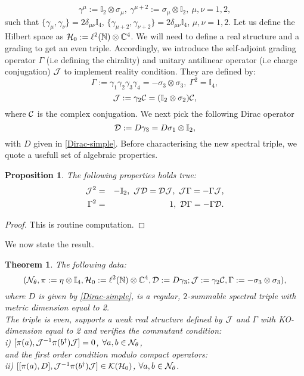 \documentclass[a4paper,11pt,twoside]{article}
\numberwithin{equation}{section}
\newcommand\bbone{{ \mathbb{I}}}
\newtheorem{theorem}[Theorem]{Theorem}
\newtheorem{proposition}[Theorem]{Proposition}
\theoremstyle{nonumberplain}
\newtheorem{proof}{Proof}
\newcounter{and}
\begin{document}
\begin{equation}
\gamma^\mu:=\bbone_2\otimes\sigma_\mu,\ \gamma^{\mu+2}:=\sigma_\mu\otimes\bbone_2,\ \mu,\nu=1,2,\label{ko-clifford}
\end{equation}
such that $\{\gamma_\mu,\gamma_\nu \}=2\delta_{\mu\nu}\bbone_4$, $\{\gamma_{\mu+2},\gamma_{\nu+2} \}=2\delta_{\mu\nu}\bbone_4$, $\mu,\nu=1,2$. Let us define the Hilbert space as ${\cal{H}}_0:=\ell^2(\mathbb{N})\otimes\mathbb{C}^4$. We will need to define a real structure and a grading to get an even triple. Accordingly, we introduce the self-adjoint grading operator $\Gamma$ (i.e defining the chirality) and unitary antilinear operator (i.e charge conjugation) ${\cal{J}}$ to implement reality condition. They are defined by:
\begin{equation}
\Gamma:=\gamma_1\gamma_2\gamma_3\gamma_4=-\sigma_3\otimes\sigma_3,\ \Gamma^2=\bbone_4\label{chiral},
\end{equation}
\begin{equation}
{\cal{J}}:=\gamma_2{\cal{C}}=(\bbone_2\otimes\sigma_2){\cal{C}},
\end{equation}
where ${\cal{C}}$ is the complex conjugation. We next pick the following Dirac operator
\begin{equation}
{\cal{D}}:=D\gamma_3=D\sigma_1\otimes\bbone_2,
\end{equation}
with $D$ given in \eqref{Dirac-simple}. Before characterising the new spectral triple, we quote a usefull set of algebraic properties.
\begin{proposition}\label{KO-real}
The following properties holds true:
\begin{eqnarray}
{\cal{J}}^2&=&-\bbone_2,\ {\cal{J}}{\cal{D}}={\cal{D}}{\cal{J}},\ {\cal{J}}\Gamma=-\Gamma{\cal{J}},\label{KO-dim}\\ 
\Gamma^2&=&1,\ {\cal{D}}\Gamma=-\Gamma{\cal{D}}\label{real-struct-grad}.
\end{eqnarray}
\end{proposition}
\begin{proof}
This is routine computation.
\end{proof}
We now state the result.
\begin{theorem}\label{th2}
The following data:
 \begin{equation}
({\cal{N}}_\theta,\pi:=\eta\otimes\bbone_4,{\cal{H}}_0:=\ell^2(\mathbb{N})\otimes\mathbb{C}^4,{\cal{D}}:=D\gamma_3;{\cal{J}}:=\gamma_2{\cal{C}},\Gamma:=-\sigma_3\otimes\sigma_3),\label{ncg-fluctuat}
\end{equation}
where $D$ is given by \eqref{Dirac-simple}, is a regular, $2$-summable spectral triple with metric dimension equal to 2. \\
The triple is even, supports a weak real structure defined by ${\cal{J}}$ and $\Gamma$ with KO-dimension equal to 2 and verifies the commutant condition:\\
i) $[\pi(a),{\cal{J}}^{-1}\pi(b^\dag){\cal{J}}]=0$, $\forall a,b\in{\cal{N}}_\theta$,\\
and the first order condition modulo compact operators: \\
ii) $[[\pi(a),D],{\cal{J}}^{-1}\pi(b^\dag){\cal{J}}]\in{\cal{K}}({\cal{H}}_0)$, $\forall a,b\in{\cal{N}}_\theta$.
\end{theorem}
\end{document}
